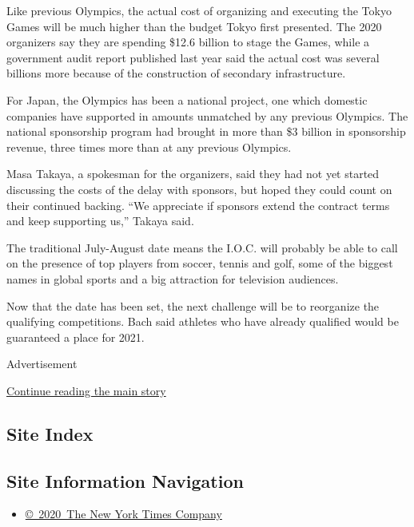 Like previous Olympics, the actual cost of organizing and executing the
Tokyo Games will be much higher than the budget Tokyo first presented.
The 2020 organizers say they are spending \$12.6 billion to stage the
Games, while a government audit report published last year said the
actual cost was several billions more because of the construction of
secondary infrastructure.

For Japan, the Olympics has been a national project, one which domestic
companies have supported in amounts unmatched by any previous Olympics.
The national sponsorship program had brought in more than \$3 billion in
sponsorship revenue, three times more than at any previous Olympics.

Masa Takaya, a spokesman for the organizers, said they had not yet
started discussing the costs of the delay with sponsors, but hoped they
could count on their continued backing. ``We appreciate if sponsors
extend the contract terms and keep supporting us,'' Takaya said.

The traditional July-August date means the I.O.C. will probably be able
to call on the presence of top players from soccer, tennis and golf,
some of the biggest names in global sports and a big attraction for
television audiences.

Now that the date has been set, the next challenge will be to reorganize
the qualifying competitions. Bach said athletes who have already
qualified would be guaranteed a place for 2021.

Advertisement

\protect\hyperlink{after-bottom}{Continue reading the main story}

\hypertarget{site-index}{%
\subsection{Site Index}\label{site-index}}

\hypertarget{site-information-navigation}{%
\subsection{Site Information
Navigation}\label{site-information-navigation}}

\begin{itemize}
\tightlist
\item
  \href{https://help.nytimes3xbfgragh.onion/hc/en-us/articles/115014792127-Copyright-notice}{©~2020~The
  New York Times Company}
\end{itemize}

